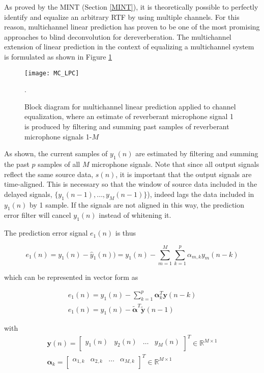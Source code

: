 As proved by the MINT (Section \ref{MINT}), it is theoretically possible to perfectly identify and equalize an arbitrary RTF by using multiple channels. For this reason, multichannel linear prediction has proven to be one of the most promising approaches to blind deconvolution for dereverberation. The multichannel extension of linear prediction in the context of equalizing a multichannel system is formulated as shown in Figure \ref{fig:MC_LPC}

\begin{figure}[H]
	\texttt{[image: MC\_LPC]}
	\centering
	\caption[Block diagram for the multichannel linear-predictive inverse filtering]{Block diagram for multichannel linear prediction applied to channel equalization, where an estimate of reverberant microphone signal 1 is produced by filtering and summing past samples of reverberant microphone signals 1-$M$}.
	\label{fig:MC_LPC}
\end{figure}

As shown, the current samples of $y_1(n)$ are estimated by filtering and summing the past $p$ samples of all $M$ microphone signals. Note that since all output signals reflect the same source data, $s(n)$, it is important that the output signals are time-aligned. This is necessary so that the window of source data included in the delayed signals, $\{y_1(n-1), \dots, y_M(n-1)\}$), indeed lags the data included in $y_1(n)$ by 1 sample. If the signals are not aligned in this way, the prediction error filter will cancel $y_1(n)$ instead of whitening it.

The prediction error signal $e_1(n)$ is thus

\noindent
\begin{equation}
	e_1(n) = y_1(n) - \hat{y}_1(n)) = y_1(n) -\sum_{m=1}^{M} \sum_{k=1}^{p} \alpha_{m,k} y_m(n-k) \label{eq:mc_lp_error}
\end{equation}

\noindent
which can be represented in vector form as

\begin{eqnarray}
	e_1(n)=y_1(n) - \sum_{k=1}^{p} \boldsymbol{\alpha}_k^T \boldsymbol{y}(n-k) \\
	e_1(n) = y_1(n) - \boldsymbol{\tilde{\alpha}}^T \boldsymbol{\tilde{y}}(n-1) \label{eq:mc_lp_error_vec}
\end{eqnarray}

\noindent
with
\begin{eqnarray}
	\boldsymbol{y}(n) = 
	\begin{bmatrix}
		y_1(n) &	y_2(n)  & \dots  & y_M(n)  \\
	\end{bmatrix}^T  \in  \mathbb{R} ^ {M \times 1} \\
	\boldsymbol{\alpha}_k = 
	\begin{bmatrix}
		\alpha_{1,k} &	\alpha_{2,k} & \dots  & \alpha_{M,k} \\
	\end{bmatrix}^T  \in  \mathbb{R} ^ {M \times 1}
\end{eqnarray}

